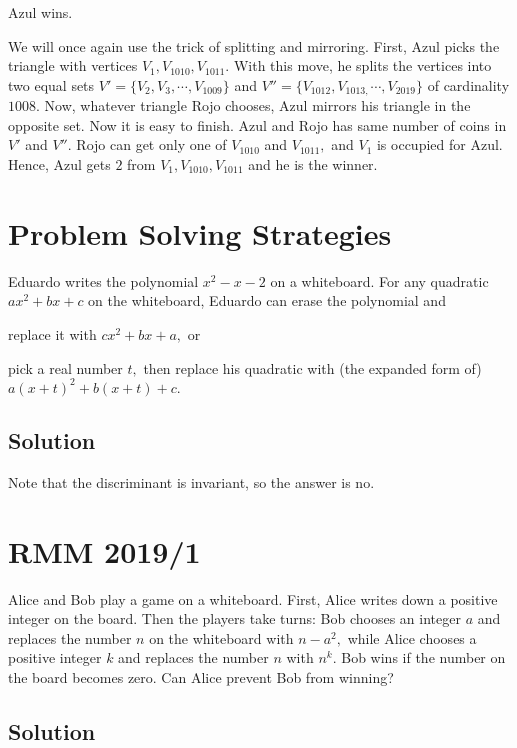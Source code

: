 \documentclass[mast]{lucky}
\begin{document}
Azul wins.

We will once again use the trick of splitting and mirroring. First, Azul picks the triangle with vertices $V_1, V_{1010}, V_{1011}.$ With this move, he splits the vertices into two equal sets $V' = \{V_2, V_3, \cdots, V_{1009} \}$ and $V'' =\{V_{1012}, V_{1013,} \cdots, V_{2019}\} $ of cardinality $1008.$ Now, whatever triangle Rojo chooses, Azul mirrors his triangle in the opposite set. Now it is easy to finish. Azul and Rojo has same number of coins in $V'$ and $V''.$ Rojo can get only one of $V_{1010}$ and $V_{1011},$ and $V_1$ is occupied for Azul. Hence, Azul gets $2$ from $V_1, V_{1010}, V_{1011}$ and he is the winner.

\pagebreak\section{Problem Solving Strategies}

Eduardo writes the polynomial $x^2-x-2$ on a whiteboard. For any quadratic $ax^2+bx+c$ on the whiteboard, Eduardo can erase the polynomial and
\begin{itemize}
        \Item replace it with $cx^2 + bx + a,$ or
        
        \Item pick a real number $t,$ then replace his quadratic with (the expanded form of)
$a(x + t)^2 + b(x + t) + c.$
\end{itemize}

\subsection{Solution}

Note that the discriminant is invariant, so the answer is no.

\pagebreak\section{RMM 2019/1}

Alice and Bob play a game on a whiteboard. First, Alice writes down a positive integer on the board. Then the players take turns: Bob chooses an integer $a$ and replaces the number $n$ on the whiteboard with $n-a^2,$ while Alice chooses a positive integer $k$ and replaces the number $n$ with $n^k.$ Bob wins if the number on the board becomes zero. Can Alice prevent Bob from winning?

\subsection{Solution}
 
\end{document}
